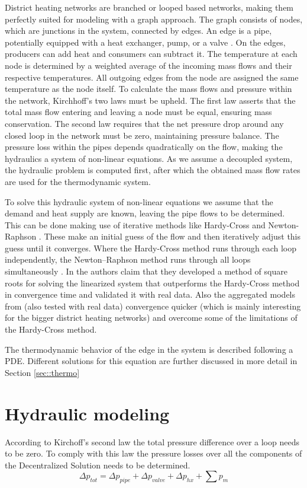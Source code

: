 District heating networks are branched or looped based networks, making them perfectly suited for modeling with a graph approach. The graph consists of nodes, which are junctions in the system, connected by edges. An edge is a pipe, potentially equipped with a heat exchanger, pump, or a valve \cite{sibeijn2025economic}. On the edges, producers can add heat and consumers can subtract it. The temperature at each node is determined by a weighted average of the incoming mass flows and their respective temperatures. All outgoing edges from the node are assigned the same temperature as the node itself. To calculate the mass flows and pressure within the network, Kirchhoff's two laws must be upheld. The first law asserts that the total mass flow entering and leaving a node must be equal, ensuring mass conservation. The second law requires that the net pressure drop around any closed loop in the network must be zero, maintaining pressure balance. The pressure loss within the pipes depends quadratically on the flow, making the hydraulics a system of non-linear equations. As we assume a decoupled system, the hydraulic problem is computed first, after which the obtained mass flow rates are used for the thermodynamic system. 

To solve this hydraulic system of non-linear equations we assume that the demand and heat supply are known, leaving the pipe flows to be determined. This can be done making use of iterative methods like Hardy-Cross \cite{HardyCross} and Newton-Raphson \cite{NewtonenHard}. These make an initial guess of the flow and then iteratively adjust this guess until it converges. Where the Hardy-Cross method runs through each loop independently, the Newton–Raphson method runs through all loops simultaneously \cite{NewtonenHard}. In \cite{STEVANOVIC} the authors claim that they developed a method of square roots for solving the linearized system that outperforms the Hardy-Cross method in convergence time and validated it with real data. Also the aggregated models from \cite{LARSEN2002995} (also tested with real data) convergence quicker (which is mainly interesting for the bigger district heating networks) and overcome some of the limitations of the Hardy-Cross method.

The thermodynamic behavior of the edge in the system is described following a PDE. Different solutions for this equation are further discussed in more detail in Section \ref{sec::thermo}

\section{Hydraulic modeling}
According to Kirchoff's second law the total pressure difference over a loop needs to be zero. To comply with this law the pressure losses over all the components of the Decentralized Solution needs to be determined. 
\begin{equation}
    \Delta p_{tot} = \Delta p_{pipe} + \Delta p_{valve} + \Delta p_{hx} + \sum p_m
\end{equation}

